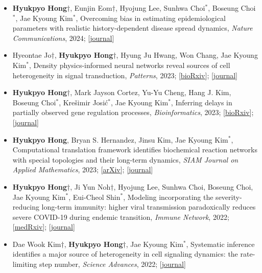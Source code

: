 \documentclass[margin,line]{res}
\begin{document}
\begin{resume}
\begin{itemize}[leftmargin=*]
    \item[10.] \textbf{Hyukpyo Hong}$\dagger$, Eunjin Eom$\dagger$, Hyojung Lee, Sunhwa Choi${}^*$, Boseung Choi${}^*$, Jae Kyoung Kim${}^*$, Overcoming bias in estimating epidemiological parameters with realistic history-dependent disease spread dynamics, \textit{Nature Communications}, 2024; [\href{https://doi.org/10.1038/s41467-024-53095-7}{\ul{journal}}]

    \item[9.] Hyeontae Jo$\dagger$, \textbf{Hyukpyo Hong}$\dagger$, Hyung Ju Hwang, Won Chang, Jae Kyoung Kim${}^*$, Density physics-informed neural networks reveal sources of cell heterogeneity in signal transduction, \textit{Patterns}, 2023; [\href{https://doi.org/10.1101/2023.07.31.551393}{\ul{bioRxiv}}]; [\href{https://doi.org/10.1016/j.patter.2023.100899}{\ul{journal}}]

    \item[8.] \textbf{Hyukpyo Hong}$\dagger$, Mark Jayson Cortez, Yu-Yu Cheng, Hang J. Kim, Boseung Choi${}^*$, Krešimir Josić${}^*$, Jae Kyoung Kim${}^*$, Inferring delays in partially observed gene regulation processes, \textit{Bioinformatics}, 2023; [\href{https://doi.org/10.1101/2022.11.27.518074}{\ul{bioRxiv}}]; [\href{https://doi.org/10.1093/bioinformatics/btad670}{\ul{journal}}]

    \item[7.] \textbf{Hyukpyo Hong}, Bryan S. Hernandez, Jinsu Kim, Jae Kyoung Kim${}^*$, Computational translation framework identifies biochemical reaction networks with special topologies and their long-term dynamics, \textit{SIAM Journal on Applied Mathematics}, 2023; [\href{https://doi.org/10.48550/arXiv.2212.01171}{\ul{arXiv}}]; [\href{https://doi.org/10.1137/22M150469X}{\ul{journal}}]

    \item[6.] \textbf{Hyukpyo Hong}$\dagger$, Ji Yun Noh$\dagger$, Hyojung Lee, Sunhwa Choi, Boseung Choi, Jae Kyoung Kim${}^*$, Eui-Cheol Shin${}^*$, Modeling incorporating the severity-reducing long-term immunity: higher viral transmission paradoxically reduces severe COVID-19 during endemic transition, \textit{Immune Network}, 2022; [\href{https://doi.org/10.1101/2022.02.09.22270633}{\ul{medRxiv}}]; [\href{https://doi.org/10.4110/in.2022.22.e23}{\ul{journal}}]

    \item[5.] Dae Wook Kim$\dagger$, \textbf{Hyukpyo Hong}$\dagger$, Jae Kyoung Kim${}^*$, Systematic inference identifies a major source of heterogeneity in cell signaling dynamics: the rate-limiting step number, \textit{Science Advances}, 2022; [\href{https://www.science.org/doi/10.1126/sciadv.abl4598}{\ul{journal}}]


\end{itemize}
\end{resume}
\end{document}
